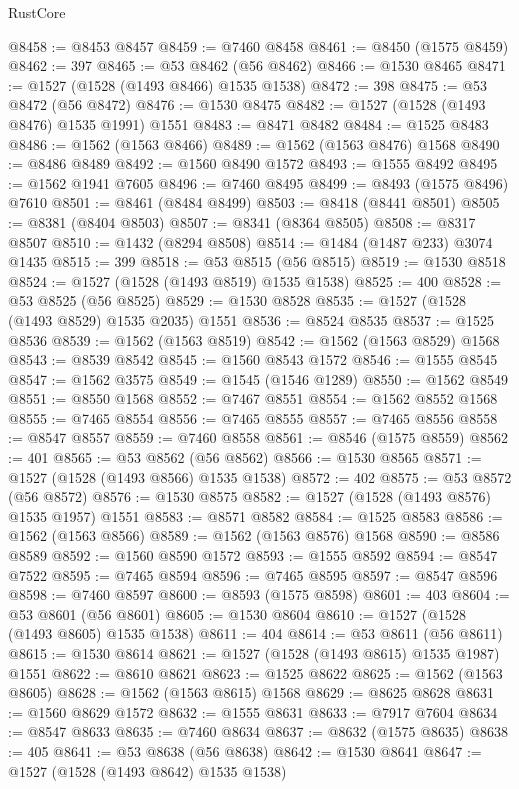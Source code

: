 \begin{lexlean}{RustCore}
\begin{coremodule}
@8458 := @8453 @8457
@8459 := @7460 @8458
@8461 := @8450 (@1575 @8459)
@8462 := 397
@8465 := @53 @8462 (@56 @8462)
@8466 := @1530 @8465
@8471 := @1527 (@1528 (@1493 @8466) @1535 @1538)
@8472 := 398
@8475 := @53 @8472 (@56 @8472)
@8476 := @1530 @8475
@8482 := @1527 (@1528 (@1493 @8476) @1535 @1991) @1551
@8483 := @8471 @8482
@8484 := @1525 @8483
@8486 := @1562 (@1563 @8466)
@8489 := @1562 (@1563 @8476) @1568
@8490 := @8486 @8489
@8492 := @1560 @8490 @1572
@8493 := @1555 @8492
@8495 := @1562 @1941 @7605
@8496 := @7460 @8495
@8499 := @8493 (@1575 @8496) @7610
@8501 := @8461 (@8484 @8499)
@8503 := @8418 (@8441 @8501)
@8505 := @8381 (@8404 @8503)
@8507 := @8341 (@8364 @8505)
@8508 := @8317 @8507
@8510 := @1432 (@8294 @8508)
@8514 := @1484 (@1487 @233) @3074 @1435
@8515 := 399
@8518 := @53 @8515 (@56 @8515)
@8519 := @1530 @8518
@8524 := @1527 (@1528 (@1493 @8519) @1535 @1538)
@8525 := 400
@8528 := @53 @8525 (@56 @8525)
@8529 := @1530 @8528
@8535 := @1527 (@1528 (@1493 @8529) @1535 @2035) @1551
@8536 := @8524 @8535
@8537 := @1525 @8536
@8539 := @1562 (@1563 @8519)
@8542 := @1562 (@1563 @8529) @1568
@8543 := @8539 @8542
@8545 := @1560 @8543 @1572
@8546 := @1555 @8545
@8547 := @1562 @3575
@8549 := @1545 (@1546 @1289)
@8550 := @1562 @8549
@8551 := @8550 @1568
@8552 := @7467 @8551
@8554 := @1562 @8552 @1568
@8555 := @7465 @8554
@8556 := @7465 @8555
@8557 := @7465 @8556
@8558 := @8547 @8557
@8559 := @7460 @8558
@8561 := @8546 (@1575 @8559)
@8562 := 401
@8565 := @53 @8562 (@56 @8562)
@8566 := @1530 @8565
@8571 := @1527 (@1528 (@1493 @8566) @1535 @1538)
@8572 := 402
@8575 := @53 @8572 (@56 @8572)
@8576 := @1530 @8575
@8582 := @1527 (@1528 (@1493 @8576) @1535 @1957) @1551
@8583 := @8571 @8582
@8584 := @1525 @8583
@8586 := @1562 (@1563 @8566)
@8589 := @1562 (@1563 @8576) @1568
@8590 := @8586 @8589
@8592 := @1560 @8590 @1572
@8593 := @1555 @8592
@8594 := @8547 @7522
@8595 := @7465 @8594
@8596 := @7465 @8595
@8597 := @8547 @8596
@8598 := @7460 @8597
@8600 := @8593 (@1575 @8598)
@8601 := 403
@8604 := @53 @8601 (@56 @8601)
@8605 := @1530 @8604
@8610 := @1527 (@1528 (@1493 @8605) @1535 @1538)
@8611 := 404
@8614 := @53 @8611 (@56 @8611)
@8615 := @1530 @8614
@8621 := @1527 (@1528 (@1493 @8615) @1535 @1987) @1551
@8622 := @8610 @8621
@8623 := @1525 @8622
@8625 := @1562 (@1563 @8605)
@8628 := @1562 (@1563 @8615) @1568
@8629 := @8625 @8628
@8631 := @1560 @8629 @1572
@8632 := @1555 @8631
@8633 := @7917 @7604
@8634 := @8547 @8633
@8635 := @7460 @8634
@8637 := @8632 (@1575 @8635)
@8638 := 405
@8641 := @53 @8638 (@56 @8638)
@8642 := @1530 @8641
@8647 := @1527 (@1528 (@1493 @8642) @1535 @1538)

\end{coremodule}
\end{lexlean}
